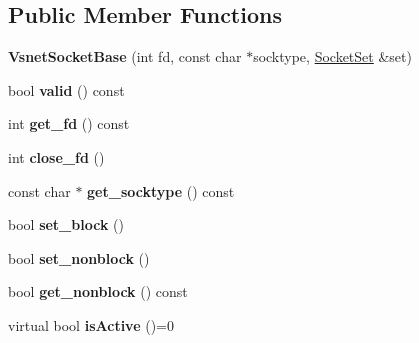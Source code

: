 \subsection*{Public Member Functions}
\begin{DoxyCompactItemize}
\item 
{\bfseries Vsnet\+Socket\+Base} (int fd, const char $\ast$socktype, \hyperlink{classSocketSet}{Socket\+Set} \&set)\hypertarget{classVsnetSocketBase_a1b78b4ea04bc43574bdfbd04a814644a}{}\label{classVsnetSocketBase_a1b78b4ea04bc43574bdfbd04a814644a}

\item 
bool {\bfseries valid} () const \hypertarget{classVsnetSocketBase_aae7b86d039df5f82073bd9d3dbfa4023}{}\label{classVsnetSocketBase_aae7b86d039df5f82073bd9d3dbfa4023}

\item 
int {\bfseries get\+\_\+fd} () const \hypertarget{classVsnetSocketBase_a36fb61c75bd7f2829c1ef1029164e4de}{}\label{classVsnetSocketBase_a36fb61c75bd7f2829c1ef1029164e4de}

\item 
int {\bfseries close\+\_\+fd} ()\hypertarget{classVsnetSocketBase_a26ed8f0eb674a345ba211796b6b8c4f7}{}\label{classVsnetSocketBase_a26ed8f0eb674a345ba211796b6b8c4f7}

\item 
const char $\ast$ {\bfseries get\+\_\+socktype} () const \hypertarget{classVsnetSocketBase_aaa22c9c10b5342d1b6f70929227a6c6f}{}\label{classVsnetSocketBase_aaa22c9c10b5342d1b6f70929227a6c6f}

\item 
bool {\bfseries set\+\_\+block} ()\hypertarget{classVsnetSocketBase_a2f21e531a9e4aa3e643fd56139f4bea2}{}\label{classVsnetSocketBase_a2f21e531a9e4aa3e643fd56139f4bea2}

\item 
bool {\bfseries set\+\_\+nonblock} ()\hypertarget{classVsnetSocketBase_aee210a68a5496ee0a40670577e321cd8}{}\label{classVsnetSocketBase_aee210a68a5496ee0a40670577e321cd8}

\item 
bool {\bfseries get\+\_\+nonblock} () const \hypertarget{classVsnetSocketBase_ae904301fde81c2b8c103e3548f2d248b}{}\label{classVsnetSocketBase_ae904301fde81c2b8c103e3548f2d248b}

\item 
virtual bool {\bfseries is\+Active} ()=0\hypertarget{classVsnetSocketBase_aca4505713ad35145d24268fdfaa0f563}{}\label{classVsnetSocketBase_aca4505713ad35145d24268fdfaa0f563}


\end{DoxyCompactItemize}
